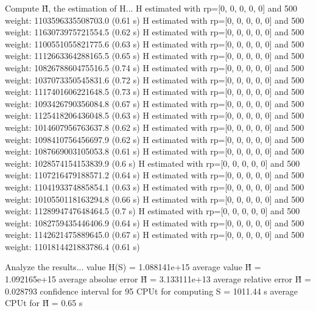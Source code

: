 Compute H̃, the estimation of H...
  H estimated with rp=[0, 0, 0, 0, 0] and 500 weight:  1103596335508703.0  (0.61 s)
  H estimated with rp=[0, 0, 0, 0, 0] and 500 weight:  1163073975721554.5  (0.62 s)
  H estimated with rp=[0, 0, 0, 0, 0] and 500 weight:  1100551055821775.6  (0.63 s)
  H estimated with rp=[0, 0, 0, 0, 0] and 500 weight:  1112663364288165.5  (0.65 s)
  H estimated with rp=[0, 0, 0, 0, 0] and 500 weight:  1082678860475516.5  (0.74 s)
  H estimated with rp=[0, 0, 0, 0, 0] and 500 weight:  1037073350545831.6  (0.72 s)
  H estimated with rp=[0, 0, 0, 0, 0] and 500 weight:  1117401606221648.5  (0.73 s)
  H estimated with rp=[0, 0, 0, 0, 0] and 500 weight:  1093426790356084.8  (0.67 s)
  H estimated with rp=[0, 0, 0, 0, 0] and 500 weight:  1125418206436048.5  (0.63 s)
  H estimated with rp=[0, 0, 0, 0, 0] and 500 weight:  1014607956763637.8  (0.62 s)
  H estimated with rp=[0, 0, 0, 0, 0] and 500 weight:  1098410756456697.9  (0.62 s)
  H estimated with rp=[0, 0, 0, 0, 0] and 500 weight:  1087669003105053.8  (0.61 s)
  H estimated with rp=[0, 0, 0, 0, 0] and 500 weight:  1028574154153839.9  (0.6 s)
  H estimated with rp=[0, 0, 0, 0, 0] and 500 weight:  1107216479188571.2  (0.64 s)
  H estimated with rp=[0, 0, 0, 0, 0] and 500 weight:  1104193374885854.1  (0.63 s)
  H estimated with rp=[0, 0, 0, 0, 0] and 500 weight:  1010550118163294.8  (0.66 s)
  H estimated with rp=[0, 0, 0, 0, 0] and 500 weight:  1128994747648464.5  (0.7 s)
  H estimated with rp=[0, 0, 0, 0, 0] and 500 weight:  1082759435446406.9  (0.64 s)
  H estimated with rp=[0, 0, 0, 0, 0] and 500 weight:  1142621475889645.0  (0.67 s)
  H estimated with rp=[0, 0, 0, 0, 0] and 500 weight:  1101814421883786.4  (0.61 s)

Analyze the results...
  value H(S)                  = 1.088141e+15 
  average value H̃             = 1.092165e+15 
  average absolue error H̃     = 3.133111e+13 
  average relative error H̃    = 0.028793 
  confidence interval for 95%
  CPUt for computing S         = 1011.44 s
  average CPUt for H̃           = 0.65 s

